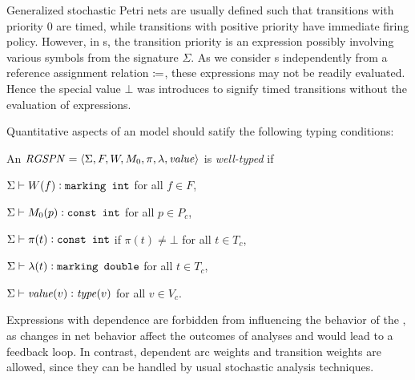 Generalized stochastic Petri nets are usually defined such that transitions with priority 0 are timed, while transitions with positive priority have immediate firing policy. However, in s, the transition priority is an expression possibly involving various symbols from the signature \(\Sigma\). As we consider s independently from a reference assignment relation \(\coloneq\), these expressions may not be readily evaluated. Hence the special value \(\bot\) was introduces to signify timed transitions without the evaluation of expressions.

Quantitative aspects of an  model should satify the following typing conditions:

\begin{dfn}
  An  \(\textrm{\itshape RGSPN\/} = \langle \Sigma, F, W, M_0, \pi, \lambda, \textrm{\itshape value\/} \rangle\) is \emph{well-typed} if
  \begin{compactitem}
  \item \(\Sigma \vdash W(f) \mathrel{\vcentcolon} \texttt{\upshape marking int}\) for all \(f \in F\),
  \item \(\Sigma \vdash M_0(p) \mathrel{\vcentcolon} \texttt{\upshape const int}\) for all \(p \in P_c\),
  \item \(\Sigma \vdash \pi(t) \mathrel{\vcentcolon} \texttt{\upshape const int}\) if \(\pi(t) \ne \bot\) for all \(t \in T_c\),
  \item \(\Sigma \vdash \lambda(t) \mathrel{\vcentcolon} \texttt{\upshape marking double}\) for all \(t \in T_c\),
  \item \(\Sigma \vdash \textrm{\itshape value\/}(v) \mathrel{\vcentcolon} \textrm{\itshape type\/}(v)\) for all \(v \in V_c\).
  \end{compactitem}
\end{dfn}

Expressions with  dependence are forbidden from influencing the behavior of the , as changes in net behavior affect the outcomes of analyses and would lead to a feedback loop. In contrast,  dependent arc weights and transition weights are allowed, since they can be handled by usual stochastic analysis techniques.

